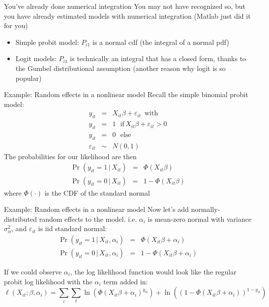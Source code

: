 \documentclass[english,xcolor=dvipsnames]{beamer}
\begin{document}
\begin{frame}{You've already done numerical integration}
You may not have recognized so, but you have already estimated models with numerical integration (Matlab just did it for you)
\begin{itemize}
	\item Simple probit model: $P_{i1}$ is a normal cdf (the integral of a normal pdf)
  \item Logit models: $P_{i1}$ is technically an integral that has a closed form, thanks to the Gumbel distributional assumption (another reason why logit is so popular)
\end{itemize}
\end{frame}

\begin{frame}{Example: Random effects in a nonlinear model}
Recall the simple binomial probit model:
\begin{eqnarray*}
y_{it}&=&X_{it}\beta+\varepsilon_{it}\,\,\,\textrm{with}\\
y_{it}&=&1\,\,\,\,\textrm{if}\,X_{it}\beta+\varepsilon_{it}>0\\
y_{it}&=&0\,\,\,\,\textrm{else}\\
\varepsilon_{it}&\sim&N\left(0,1\right)
\end{eqnarray*}
The probabilities for our likelihood are then
\begin{eqnarray*}
\Pr\left(y_{it}=1\,\vert\,X_{it}\right) &=&   \Phi\left(X_{it}\beta\right)\\
\Pr\left(y_{it}=0\,\vert\,X_{it}\right) &=& 1-\Phi\left(X_{it}\beta\right)
\end{eqnarray*}
where $\Phi\left(\cdot\right)$ is the CDF of the standard normal
\end{frame}

\begin{frame}{Example: Random effects in a nonlinear model}
Now let's add normally-distributed random effects to the model. i.e. $\alpha_i$ is mean-zero normal with variance $\sigma^{2}_{\alpha}$, and $\varepsilon_{it}$ is iid standard normal:
\begin{eqnarray*}
\Pr\left(y_{it}=1\,\vert\,X_{it},\alpha_{i}\right) &=&   \Phi\left(X_{it}\beta+\alpha_{i}\right)\\
\Pr\left(y_{it}=0\,\vert\,X_{it},\alpha_{i}\right) &=& 1-\Phi\left(X_{it}\beta+\alpha_{i}\right)
\end{eqnarray*}

If we could observe $\alpha_i$, the log likelihood function would look like the regular probit log likelihood with the $\alpha_i$ term added in:
\begin{equation*}
\ell(X_{it};\beta,\alpha_{i})=\sum_{i}\sum_{t}\ln\left(\Phi\left(X_{it}\beta+\alpha_{i}\right)^{y_{it}}\right)+\ln\left(\left(1-\Phi\left(X_{it}\beta+\alpha_{i}\right)\right)^{1-y_{it}}\right)
\end{equation*}
\end{frame}
\end{document}
